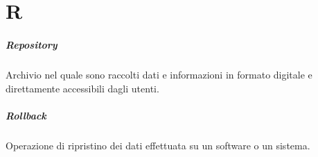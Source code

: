 \chapter{R}

\paragraph*{Repository}
Archivio nel quale sono raccolti dati e informazioni in formato digitale e direttamente accessibili dagli utenti.

\paragraph*{Rollback}
Operazione di ripristino dei dati effettuata su un software o un sistema.
